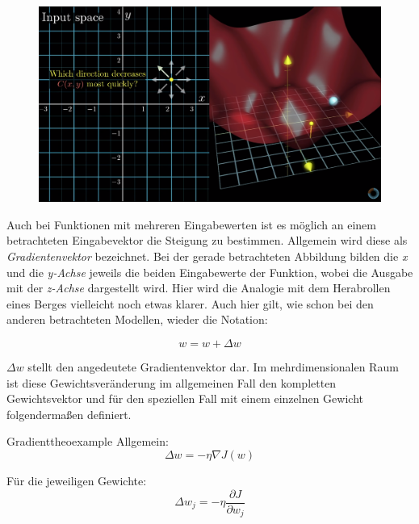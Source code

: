 \begin{figure}[!htb]
	\centering
	\includegraphics[width=\linewidth]{img/3dPlot_1}
	\label{fig:ad_gd3}
\end{figure}

Auch bei Funktionen mit mehreren Eingabewerten ist es möglich an einem betrachteten Eingabevektor die Steigung zu bestimmen. Allgemein wird diese als \emph{Gradientenvektor} bezeichnet. Bei der gerade betrachteten Abbildung bilden die \emph{x} und die \emph{y-Achse} jeweils die beiden Eingabewerte der Funktion, wobei die Ausgabe mit der \emph{z-Achse} dargestellt wird. Hier wird die Analogie mit dem Herabrollen eines Berges vielleicht noch etwas klarer. Auch hier gilt, wie  schon bei den anderen betrachteten Modellen, wieder die Notation: 

\begin{equation} \label{eq:gewupd}
{w = w + \Delta w}
\end{equation}

${\Delta w}$ stellt den angedeutete Gradientenvektor dar. Im mehrdimensionalen Raum ist diese Gewichtsveränderung im allgemeinen Fall den kompletten Gewichtsvektor und für den speziellen Fall mit einem einzelnen Gewicht folgendermaßen definiert. 

\vspace{3mm}
\begin{mytheo}{Gradient}{theoexample} \label{theo:gradient1}
Allgemein: 
\begin{equation}
{\Delta w = - \eta \nabla J(w)}
\end{equation}

Für die jeweiligen Gewichte: 
\begin{equation}
\Delta w_j = - \eta \frac{\partial J}{\partial w_j}
\end{equation}

\end{mytheo}

